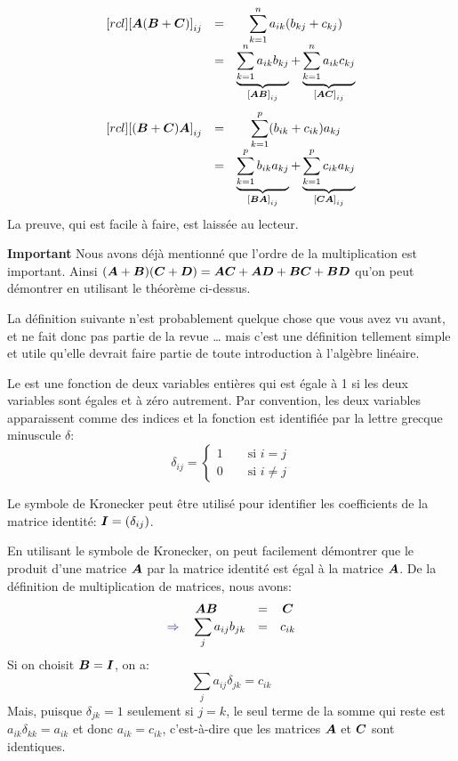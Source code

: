 \begin{theo}
    \[
    \begin{matrix}[rcl]
    {[} \boldsymbol{A}(\boldsymbol{B}+\boldsymbol{C}){]}_{ij} &=& \displaystyle \sum_{k=1}^n a_{ik}(b_{kj} + c_{kj}) \\
    &=& \underbrace{\sum_{k=1}^n a_{ik}b_{kj}}_{{[} \boldsymbol{A}\boldsymbol{B}{]}_{ij}} + \underbrace{\sum_{k=1}^n a_{ik} c_{kj}}_{{[} \boldsymbol{A}\boldsymbol{C}{]}_{ij}}
\end{matrix}     
    \]\cqfd
{}     \[
    \begin{matrix}[rcl]
    {[}(\boldsymbol{B}+\boldsymbol{C})\boldsymbol{A}{]}_{ij} &=& \displaystyle \sum_{k=1}^p (b_{ik} + c_{ik})a_{kj} \\
    &=& \underbrace{\sum_{k=1}^p b_{ik}a_{kj}}_{{[} \boldsymbol{B}\boldsymbol{A}{]}_{ij}} + \underbrace{\sum_{k=1}^p c_{ik} a_{kj}}_{{[} \boldsymbol{C}\boldsymbol{A}{]}_{ij}}
\end{matrix}     
    \]\cqfd
{} La preuve, qui est facile à faire, est laissée au lecteur.
\end{theo}

\textbf{Important} Nous avons déjà mentionné que l'ordre de la multiplication est important.  Ainsi
$ (\boldsymbol{A} + \boldsymbol{B})(\boldsymbol{C} + \boldsymbol{D}) = \boldsymbol{A}\boldsymbol{C} + \boldsymbol{A}\boldsymbol{D} + \boldsymbol{B}\boldsymbol{C} + \boldsymbol{B}\boldsymbol{D} $
qu'on peut démontrer en utilisant le théorème ci-dessus.

La définition suivante n'est probablement quelque chose que vous avez vu avant, et ne fait donc pas partie de la revue \ldots 
mais c'est une définition tellement simple et utile qu'elle devrait faire partie de toute introduction à l'algèbre linéaire.

\begin{defini}
Le  est une fonction de deux variables entières 
qui est égale à 1 si les deux variables sont égales et à zéro autrement.
Par convention, les deux variables apparaissent comme des indices et la fonction est identifiée par la lettre grecque minuscule $\delta$:
\[
\delta_{ij} = \left\{
\begin{matrix}
1 \qquad\mbox{si $i=j$} \\
0 \qquad\mbox{si $i\neq j$}
\end{matrix}
\right.
\]
\end{defini}
Le symbole de Kronecker peut être utilisé pour identifier les coefficients de la matrice identité: $\boldsymbol{I} = (\delta_{ij})$.  
\begin{exemple}
En utilisant le symbole de Kronecker, on peut facilement démontrer que le produit d'une matrice $\boldsymbol{A}$ par la matrice
identité est égal à la matrice $\boldsymbol{A}$.  De la définition de multiplication de matrices, nous avons:
\[
\begin{matrix}
\boldsymbol{A} \boldsymbol{B} &=& \boldsymbol{C} \\
{\color{blue}\Rightarrow}\quad \displaystyle\sum_{j} a_{ij} b_{jk} &=& c_{ik}
\end{matrix}
\]
Si on choisit $\boldsymbol{B} = \boldsymbol{I}$, on a:
\[
\sum_{j} a_{ij} \delta_{jk} = c_{ik}
\]
Mais, puisque $\delta_{jk} = 1$ seulement si $j=k$, le seul terme de la somme qui reste est
$a_{ik} \delta_{kk}=a_{ik}$ et donc  $a_{ik} = c_{ik}$, c'est-à-dire que les matrices $\boldsymbol{A}$ et $\boldsymbol{C}$ sont identiques.
\end{exemple}

